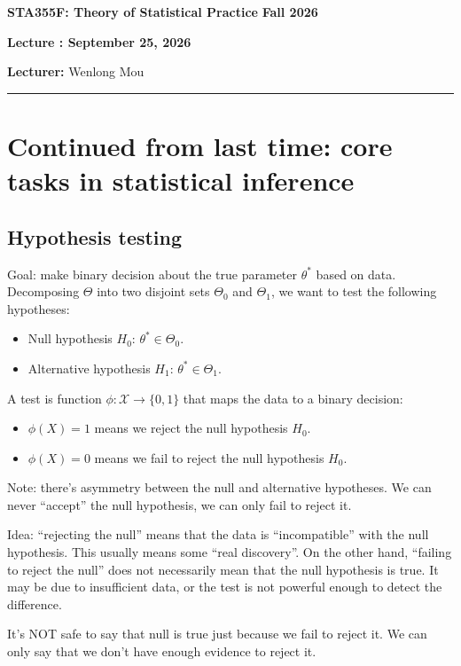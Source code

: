 \documentclass[11pt,letterpaper]{article}
\newcommand{\coursenumber}{STA355F}
\newcommand{\coursetitle}{Theory of Statistical Practice}
\newcommand{\courseterm}{Fall 2026}
\newcounter{lecture}
\newcommand{\lecturenumber}{\arabic{lecture}}
\newcommand{\lecturedate}{September 25, 2026}
\newcommand{\lecturer}{Wenlong Mou}
\numberwithin{assumption}{lecture}
\numberwithin{theorem}{lecture}
\numberwithin{proposition}{lecture}
\numberwithin{lemma}{lecture}
\numberwithin{claim}{lecture}
\numberwithin{corollary}{lecture}
\numberwithin{definition}{lecture}
\numberwithin{conjecture}{lecture}
\numberwithin{remark}{lecture}
\numberwithin{example}{lecture}
\numberwithin{equation}{lecture}
\newcommand{\makelecturenotesheader}{%
  \noindent
  \textbf{\coursenumber: \coursetitle}%
  \hfill
  \textbf{\courseterm}

  \begin{center}
    {\Large\bfseries Lecture \lecturenumber: \lecturedate}
  \end{center}

  \noindent
  \textbf{Lecturer:} \lecturer
  \par\medskip
  \hrule
  \bigskip
}
\begin{document}
\makelecturenotesheader

\section{Continued from last time: core tasks in statistical inference}

\subsection{Hypothesis testing}
Goal: make binary decision about the true parameter $\theta^*$ based on data. Decomposing $\Theta$ into two disjoint sets $\Theta_0$ and $\Theta_1$, we want to test the following hypotheses:
\begin{itemize}
  \item Null hypothesis $H_0$: $\theta^* \in \Theta_0$.
  \item Alternative hypothesis $H_1$: $\theta^* \in \Theta_1$.
\end{itemize}
A test is function $\phi: \mathcal{X} \to \{0, 1\}$ that maps the data to a binary decision:
\begin{itemize}
  \item $\phi(X) = 1$ means we reject the null hypothesis $H_0$.
  \item $\phi(X) = 0$ means we fail to reject the null hypothesis $H_0$.
\end{itemize}
Note: there's asymmetry between the null and alternative hypotheses. We can never ``accept'' the null hypothesis, we can only fail to reject it.

Idea: ``rejecting the null'' means that the data is ``incompatible'' with the null hypothesis. This usually means some ``real discovery''. On the other hand, ``failing to reject the null'' does not necessarily mean that the null hypothesis is true. It may be due to insufficient data, or the test is not powerful enough to detect the difference.

It's NOT safe to say that null is true just because we fail to reject it. We can only say that we don't have enough evidence to reject it.
\end{document}
